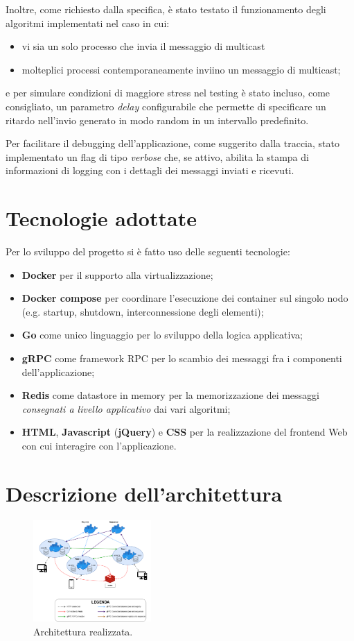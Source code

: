 \documentclass[conference]{IEEEtran}
\begin{document}
Inoltre, come richiesto dalla specifica, è stato testato il funzionamento degli algoritmi implementati nel caso in cui:
\begin{itemize}
\item vi sia un solo processo che invia il messaggio di multicast
\item molteplici processi contemporaneamente inviino un
messaggio di multicast;
\end{itemize}
e per simulare condizioni di maggiore stress nel testing è stato incluso, come consigliato, un parametro \textit{delay} configurabile che permette di specificare un ritardo nell'invio generato in modo random in un intervallo predefinito.

Per facilitare il debugging dell'applicazione, come suggerito dalla traccia,  stato implementato un flag di tipo \textit{verbose} che, se attivo, abilita la stampa di informazioni di logging con i dettagli dei messaggi inviati e ricevuti.

\section{Tecnologie adottate}
Per lo sviluppo del progetto si è fatto uso delle seguenti tecnologie:
\begin{itemize}
\item \textbf{Docker} per il supporto alla virtualizzazione;
\item \textbf{Docker compose} per coordinare l'esecuzione dei container sul singolo nodo (e.g. startup, shutdown, interconnessione degli elementi);
\item \textbf{Go} come unico linguaggio per lo sviluppo della logica applicativa;
\item \textbf{gRPC} come framework RPC per lo scambio dei messaggi fra i componenti dell'applicazione;
\item \textbf{Redis} come datastore in memory per la memorizzazione dei messaggi \textit{consegnati a livello applicativo} dai vari algoritmi;
\item \textbf{HTML}, \textbf{Javascript} (\textbf{jQuery}) e \textbf{CSS} per la realizzazione del frontend Web con cui interagire con l'applicazione.
\end{itemize}

\section{Descrizione dell'architettura}
\begin{figure}[htbp]
\centerline{\includegraphics[width=0.4\textwidth]{figs/architecture.png}}
\caption{Architettura realizzata.}
\label{fig:architecture}
\end{figure}
\end{document}
